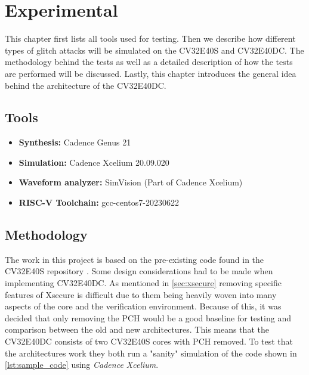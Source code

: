 \chapter{Experimental}
\label{chap4}

This chapter first lists all tools used for testing. Then we describe how different types of glitch attacks will be simulated on the CV32E40S and CV32E40DC. The methodology behind the tests as well as a detailed description of how the tests are performed will be discussed. Lastly, this chapter introduces the general idea behind the architecture of the CV32E40DC. 

\section{Tools}
\label{sec:tools}

\begin{itemize}
    \item \textbf{Synthesis:} Cadence Genus 21\cite{cadence}
    \item \textbf{Simulation:} Cadence Xcelium 20.09.020\cite{xcelium}
    \item \textbf{Waveform analyzer:} SimVision (Part of Cadence Xcelium)\cite{simvision}
    \item \textbf{RISC-V Toolchain:} gcc-centos7-20230622\cite{toolchain}
\end{itemize}

\section{Methodology}
\label{sec:method}

The work in this project is based on the pre-existing code found in the CV32E40S repository \cite{cv32e40s_github}. Some design considerations had to be made when implementing CV32E40DC. As mentioned in \autoref{sec:xsecure} removing specific features of Xsecure is difficult due to them being heavily woven into many aspects of the core and the verification environment. Because of this, it was decided that only removing the PCH would be a good baseline for testing and comparison between the old and new architectures. This means that the CV32E40DC consists of two CV32E40S cores with PCH removed. To test that the architectures work they both run a "sanity" simulation of the code shown in \autoref{lst:sample_code} using \textit{Cadence Xcelium}.

